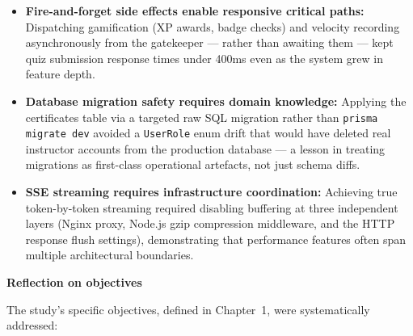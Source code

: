 \begin{itemize}
    \item \textbf{Fire-and-forget side effects enable responsive critical paths:} Dispatching gamification (XP awards, badge checks) and velocity recording asynchronously from the gatekeeper — rather than awaiting them — kept quiz submission response times under 400ms even as the system grew in feature depth.
    \item \textbf{Database migration safety requires domain knowledge:} Applying the certificates table via a targeted raw SQL migration rather than \texttt{prisma migrate dev} avoided a \texttt{UserRole} enum drift that would have deleted real instructor accounts from the production database --- a lesson in treating migrations as first-class operational artefacts, not just schema diffs.
    \item \textbf{SSE streaming requires infrastructure coordination:} Achieving true token-by-token streaming required disabling buffering at three independent layers (Nginx proxy, Node.js gzip compression middleware, and the HTTP response flush settings), demonstrating that performance features often span multiple architectural boundaries.
\end{itemize}

\textbf{Reflection on objectives}

The study's specific objectives, defined in Chapter~1, were systematically addressed:

